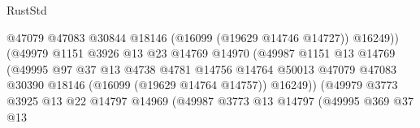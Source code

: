 \begin{lexlean}{RustStd}
\begin{coremodule}
                                                @47079
                                                @47083
                                                @30844
                                                @18146
                                                (@16099 (@19629 @14746 @14727))
                                                @16249))
                                            (@49979
                                              @1151
                                              @3926
                                              @13
                                              @23
                                              @14769
                                              @14970
                                              (@49987
                                                @1151
                                                @13
                                                @14769
                                                (@49995
                                                  @97
                                                  @37
                                                  @13
                                                  @4738
                                                  @4781
                                                  @14756
                                                  @14764
                                                  @50013
                                                  @47079
                                                  @47083
                                                  @30390
                                                  @18146
                                                  (@16099 (@19629 @14764 @14757))
                                                  @16249))
                                              (@49979
                                                @3773
                                                @3925
                                                @13
                                                @22
                                                @14797
                                                @14969
                                                (@49987
                                                  @3773
                                                  @13
                                                  @14797
                                                  (@49995
                                                    @369
                                                    @37
                                                    @13

\end{coremodule}
\end{lexlean}
